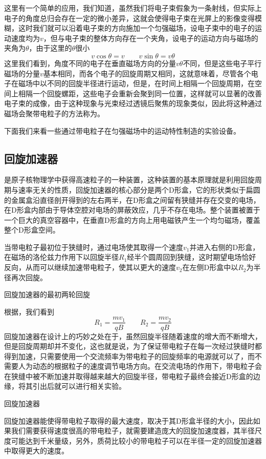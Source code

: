 这里有一个简单的应用，我们知道，虽然我们将电子束假象为一条射线，但实际上电子的角度总归会存在一定的微小差异，这就会使得电子束在光屏上的影像变得模糊，这时我们就可以沿着电子束的方向施加一个匀强磁场，设电子束中的电子的运动速度均为$v$，但与电子束的整体方向存在一个夹角，设电子的运动方向与磁场的夹角为$\theta$，由于这里的$\theta$很小
\begin{equation*}
    v\cos\theta=v\qquad v\sin\theta=v\theta
\end{equation*}
这里我们看到，角度不同的电子在垂直磁场方向的分量$v\theta$不同，但是这些电子平行磁场的分量$v$基本相同，而各个电子的回旋周期又相同，这就意味着，尽管各个电子在磁场中以不同的回旋半径进行运动，但是，在时间上相隔一个回旋周期，在空间上相隔一个回旋螺距，这些电子会重新会聚到同一位置，这样就可以显著的改善电子束的成像，由于这种现象与光束经过透镜后聚焦的现象类似，因此将这种通过磁场会聚带电粒子的方法称为。

下面我们来看一些通过带电粒子在匀强磁场中的运动特性制造的实验设备。

\subsection{回旋加速器}
是原子核物理学中获得高速粒子的一种装置，这种装置的基本原理就是利用回旋周期与速率无关的性质，回旋加速器的核心部分是两个D形盒，它的形状类似于扁圆的金属盒沿直径剖开得到的左右两半，在D形盒之间留有狭缝并存在交变的电场，在D形盒内部由于导体空腔对电场的屏蔽效应，几乎不存在电场。整个装置被置于一个巨大的真空容器中，在垂直D形盒的方向上用电磁铁产生一个均匀磁场，覆盖整个D形盒空间。

当带电粒子最初位于狭缝时，通过电场使其取得一个速度$v_1$并进入右侧的D形盒，在磁场的洛伦兹力作用下以回旋半径$R_1$经半个圆周回到狭缝，这时期望电场恰好反向，从而可以继续加速带电粒子，使其以更大的速度$v_2$在左侧D形盒中以$R_2$为半径再次回旋。
\begin{Figure}{回旋加速器的最初两轮回旋}
    \qquad
\end{Figure}
根据，我们看到
\begin{equation*}
    R_1=\frac{mv_1}{qB}\qquad R_2=\frac{mv_2}{qB}
\end{equation*}
回旋加速器在设计上的巧妙之处在于，虽然回旋半径随着速度的增大而不断增大，但是回旋周期却并不变化，这也就是说，为了保证带电粒子在每一次经过狭缝时都得到加速，只需要使用一个交流频率为带电粒子的回旋频率的电源就可以了，而不需要人为动态的根据粒子的速度调节电场方向。在交流电场的作用下，带电粒子会在狭缝中被不断加速并取得越来越大的回旋半径，带电粒子最终会接近D形盒的边缘，将其引出后就可以进行相关实验。
\begin{Figure}{回旋加速器}
\end{Figure}
回旋加速器能使得带电粒子取得的最大速度，取决于其D形盒半径的大小，因此如果我们需要获得速度很高的带电粒子，就需要建造庞大的回旋加速度器，其半径尺度可能达到千米量级，另外，质荷比较小的带电粒子可以在半径一定的回旋加速器中取得更大的速度。

